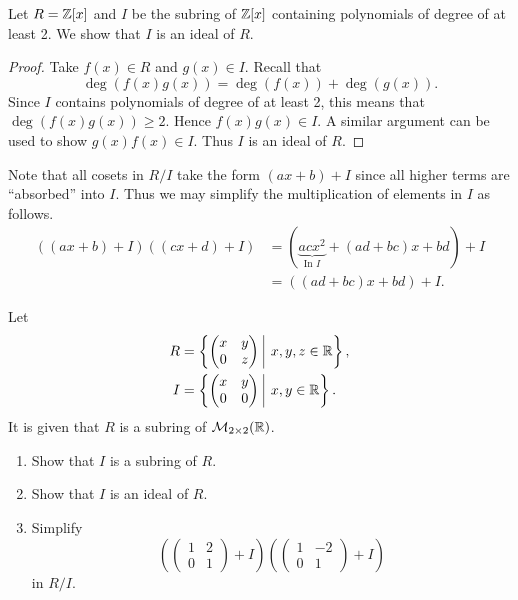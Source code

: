 \begin{example}
    Let $R = \mathbb{Z}[x]$ and $I$ be the subring of $\mathbb{Z}[x]$ containing polynomials of degree of at least 2. We show that $I$ is an ideal of $R$.
    \begin{proof}
        Take $f(x) \in R$ and $g(x) \in I$. Recall that
        \[
            \deg(f(x)g(x)) = \deg(f(x)) + \deg(g(x)).
        \]
        Since $I$ contains polynomials of degree of at least 2, this means that $\deg(f(x)g(x)) \geq 2$. Hence $f(x)g(x) \in I$. A similar argument can be used to show $g(x)f(x) \in I$. Thus $I$ is an ideal of $R$.
    \end{proof}
    Note that all cosets in $R/I$ take the form $(ax+b) + I$ since all higher terms are ``absorbed'' into $I$. Thus we may simplify the multiplication of elements in $I$ as follows.
    \begin{align*}
        ((ax+b)+I)((cx+d)+I) &= (\underbrace{acx^2}_{\text{In } I} + (ad+bc)x + bd) + I\\
        &= ((ad+bc)x + bd) + I.
    \end{align*}
\end{example}
\begin{exercise}
    Let
    \begin{align*}
        R &= \left\{\begin{pmatrix}x&y\\0&z\end{pmatrix} \vert x,y,z \in \R\right\},\\
        I &= \left\{\begin{pmatrix}x&y\\0&0\end{pmatrix} \vert x,y \in \R\right\}.
    \end{align*}
    It is given that $R$ is a subring of $\mathcal{M}_{2\times2}(\mathbb{R})$.
    \begin{enumerate}[label=(\roman*)]
        \item Show that $I$ is a subring of $R$.
        \item Show that $I$ is an ideal of $R$.
        \item Simplify
        \[
            \left(\begin{pmatrix}1&2\\0&1\end{pmatrix} + I\right)\left(\begin{pmatrix}1&-2\\0&1\end{pmatrix} + I\right)
        \]
        in $R/I$.
    \end{enumerate}
\end{exercise}

